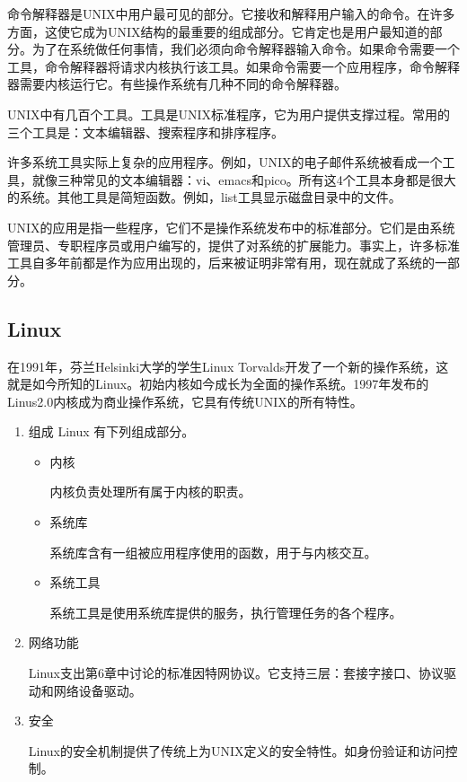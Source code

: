 命令解释器是UNIX中用户最可见的部分。它接收和解释用户输入的命令。在许多方面，这使它成为UNIX结构的最重要的组成部分。它肯定也是用户最知道的部分。为了在系统做任何事情，我们必须向命令解释器输入命令。如果命令需要一个工具，命令解释器将请求内核执行该工具。如果命令需要一个应用程序，命令解释器需要内核运行它。有些操作系统有几种不同的命令解释器。

UNIX中有几百个工具。工具是UNIX标准程序，它为用户提供支撑过程。常用的三个工具是：文本编辑器、搜索程序和排序程序。

许多系统工具实际上复杂的应用程序。例如，UNIX的电子邮件系统被看成一个工具，就像三种常见的文本编辑器：vi、emacs和pico。所有这4个工具本身都是很大的系统。其他工具是简短函数。例如，list工具显示磁盘目录中的文件。

UNIX的应用是指一些程序，它们不是操作系统发布中的标准部分。它们是由系统管理员、专职程序员或用户编写的，提供了对系统的扩展能力。事实上，许多标准工具自多年前都是作为应用出现的，后来被证明非常有用，现在就成了系统的一部分。
\subsection{Linux}
在1991年，芬兰Helsinki大学的学生Linux Torvalds开发了一个新的操作系统，这就是如今所知的Linux。初始内核如今成长为全面的操作系统。1997年发布的Linus2.0内核成为商业操作系统，它具有传统UNIX的所有特性。
\begin{enumerate}
	\item 组成
	Linux 有下列组成部分。
	\begin{itemize}
		\item 内核

		内核负责处理所有属于内核的职责。
		\item 系统库

		系统库含有一组被应用程序使用的函数，用于与内核交互。
		\item 系统工具

		系统工具是使用系统库提供的服务，执行管理任务的各个程序。
	\end{itemize}
	\item 网络功能

	Linux支出第6章中讨论的标准因特网协议。它支持三层：套接字接口、协议驱动和网络设备驱动。
	\item 安全

	Linux的安全机制提供了传统上为UNIX定义的安全特性。如身份验证和访问控制。
\end{enumerate}
